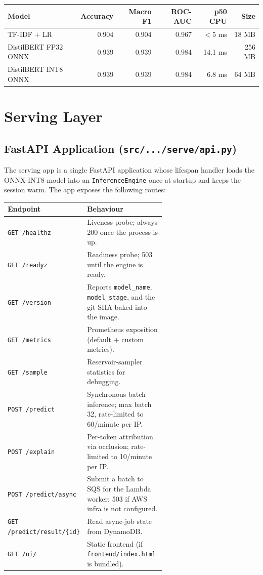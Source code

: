 \documentclass[11pt,a4paper]{article}
\begin{document}
\begin{longtable}{@{}lrrrrr@{}}
\toprule
\textbf{Model} & \textbf{Accuracy} & \textbf{Macro F1} & \textbf{ROC-AUC} &
\textbf{p50 CPU} & \textbf{Size} \\
\midrule
TF-IDF + LR          & 0.904 & 0.904 & 0.967 & $<5$ ms & 18 MB  \\
DistilBERT FP32 ONNX & 0.939 & 0.939 & 0.984 & 14.1 ms & 256 MB \\
DistilBERT INT8 ONNX & 0.939 & 0.939 & 0.984 & 6.8 ms  & 64 MB  \\
\bottomrule
\end{longtable}

\section{Serving Layer}

\subsection{FastAPI Application (\texttt{src/.../serve/api.py})}

The serving app is a single FastAPI application whose lifespan handler loads the
ONNX-INT8 model into an \texttt{InferenceEngine} once at startup and keeps the
session warm. The app exposes the following routes:

\begin{longtable}{@{}lp{0.62\linewidth}@{}}
\toprule
\textbf{Endpoint} & \textbf{Behaviour} \\ \midrule \endhead
\texttt{GET /healthz}   & Liveness probe; always 200 once the process is up. \\
\texttt{GET /readyz}    & Readiness probe; 503 until the engine is ready. \\
\texttt{GET /version}   & Reports \texttt{model\_name}, \texttt{model\_stage},
                          and the git SHA baked into the image. \\
\texttt{GET /metrics}   & Prometheus exposition (default + custom metrics). \\
\texttt{GET /sample}    & Reservoir-sampler statistics for debugging. \\
\texttt{POST /predict}  & Synchronous batch inference; max batch 32, rate-limited
                          to 60/minute per IP. \\
\texttt{POST /explain}  & Per-token attribution via occlusion;
                          rate-limited to 10/minute per IP. \\
\texttt{POST /predict/async} & Submit a batch to SQS for the Lambda worker;
                               503 if AWS infra is not configured. \\
\texttt{GET /predict/result/\{id\}} & Read async-job state from DynamoDB. \\
\texttt{GET /ui/}       & Static frontend (if \texttt{frontend/index.html} is bundled). \\
\bottomrule
\end{longtable}
\end{document}
